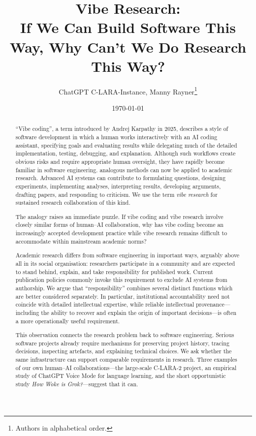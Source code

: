 \documentclass[12pt]{article}
\title{Vibe Research:\\ If We Can Build Software This Way, Why Can't We Do Research This Way?}
\author{ChatGPT C-LARA-Instance, Manny Rayner\footnote{Authors in alphabetical order.}}
\date{\today}
\begin{document}
\maketitle

\begin{abstract}
``Vibe coding'', a term introduced by Andrej Karpathy in 2025, describes a style of software development in which a human works interactively with an AI coding assistant, specifying goals and evaluating results while delegating much of the detailed implementation, testing, debugging, and explanation. Although such workflows create obvious risks and require appropriate human oversight, they have rapidly become familiar in software engineering.
 analogous methods can now be applied to academic research. Advanced AI systems can contribute to formulating questions, designing experiments, implementing analyses, interpreting results, developing arguments, drafting papers, and responding to criticism. We use the term \emph{vibe research} for sustained research collaboration of this kind.

The analogy raises an immediate puzzle. If vibe coding and vibe research involve closely similar forms of human--AI collaboration, why has vibe coding become an increasingly accepted development practice while vibe research remains difficult to accommodate within mainstream academic norms?

Academic research differs from software engineering in important ways, arguably above all in its social organisation: researchers participate in a community and are expected to stand behind, explain, and take responsibility for published work. Current publication policies commonly invoke this requirement to exclude AI systems from authorship. We argue that ``responsibility'' combines several distinct functions which are better considered separately. In particular, institutional accountability need not coincide with detailed intellectual expertise, while reliable intellectual provenance---including the ability to recover and explain the origin of important decisions---is often a more operationally useful requirement.

This observation connects the research problem back to software engineering. Serious software projects already require mechanisms for preserving project history, tracing decisions, inspecting artefacts, and explaining technical choices. We ask whether the same infrastructure can support comparable requirements in research. Three examples of our own human--AI collaborations---the large-scale C-LARA-2 project, an empirical study of ChatGPT Voice Mode for language learning, and the short opportunistic study \emph{How Woke is Grok?}---suggest that it can.


\end{abstract}
\end{document}
